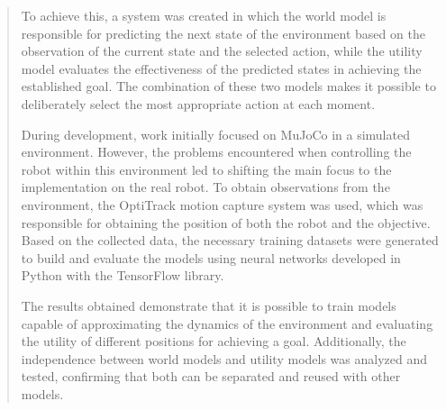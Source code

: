 \begin{abstract}
\begin{segundoresumo}
    To achieve this, a system was created in which the world model is responsible for predicting the next state of the environment based on the observation of the current state and the selected 
    action, while the utility model evaluates the effectiveness of the predicted states in achieving the established goal. The combination of these two models makes it possible to deliberately 
    select the most appropriate action at each moment.

    During development, work initially focused on MuJoCo in a simulated environment. However, the problems encountered when controlling the robot within this environment led to shifting the main 
    focus to the implementation on the real robot. To obtain observations from the environment, the OptiTrack motion capture system was used, which was responsible for obtaining the position of 
    both the robot and the objective. Based on the collected data, the necessary training datasets were generated to build and evaluate the models using neural networks developed in Python with 
    the TensorFlow library.

    The results obtained demonstrate that it is possible to train models capable of approximating the dynamics of the environment and evaluating the utility of different positions for achieving 
    a goal. Additionally, the independence between world models and utility models was analyzed and tested, confirming that both can be separated and reused with other models.

  \end{segundoresumo}
\vspace*{25pt}

\end{abstract}
\pagestyle{fancy}

